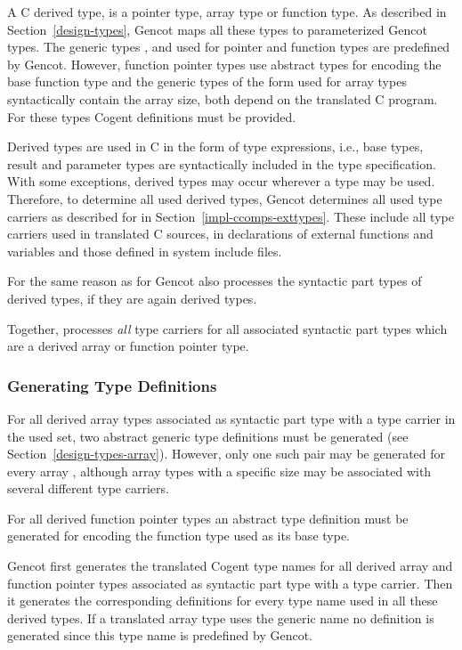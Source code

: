 A C derived type, is a pointer type, array type or function type. As described in 
Section~\ref{design-types}, Gencot maps all these types to parameterized Gencot types. The generic types ,
 and  used for pointer and function types are predefined by Gencot. However, function
pointer types use abstract types for encoding the base function type and the generic 
types of the form  used for array types syntactically contain the array size, both
depend on the translated C program. For these types Cogent definitions must be provided.

Derived types are used in C in the form of type expressions, i.e., base types, result and parameter types are 
syntactically included in the type specification. With some exceptions, derived types may occur wherever a type
may be used. Therefore, to determine all used derived types, Gencot determines all used type carriers as
described for  in Section~\ref{impl-ccomps-exttypes}. These include all type carriers used 
in translated C sources, in declarations of external functions and variables and those defined in system
include files.

For the same reason as for  Gencot also processes the syntactic part types of derived types,
if they are again derived types.

Together,  processes
\textit{all} type carriers for all associated syntactic part types which are a derived array or function pointer type.

\subsubsection{Generating Type Definitions}

For all derived array types associated as syntactic part type with a type carrier in the used set, two abstract 
generic type definitions must be generated
(see Section~\ref{design-types-array}). However, only one such pair may be generated for every array , 
although array types with a specific size may be associated with several different type carriers.

For all derived function pointer types an abstract type definition must be generated for encoding the function
type used as its base type.

Gencot first generates the translated Cogent type names for all derived array and function pointer types associated 
as syntactic part type with a type carrier. Then it generates the corresponding definitions for every type name
used in all these derived types. If a translated array type uses the generic name  no definition
is generated since this type name is predefined by Gencot.

